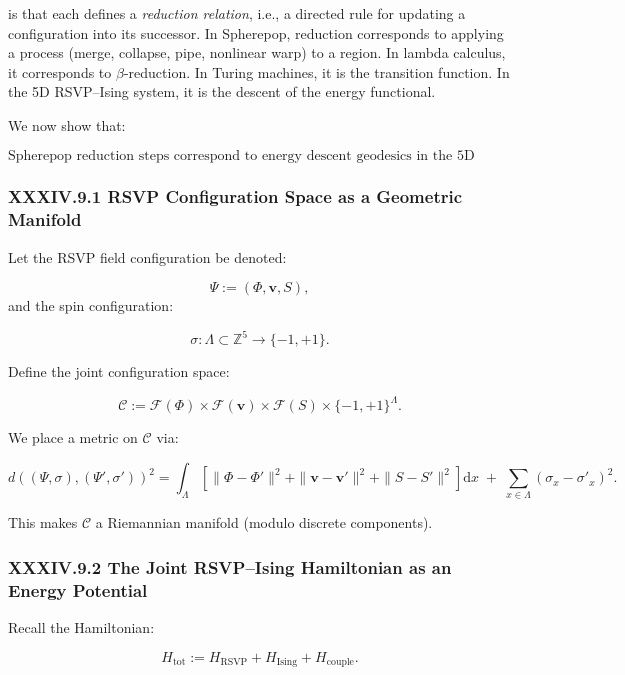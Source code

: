 \documentclass[11pt,letterpaper]{article}
\begin{document}
is that each defines a \emph{reduction relation}, i.e., a directed rule for updating a configuration into its successor. In Spherepop, reduction corresponds to applying a process (merge, collapse, pipe, nonlinear warp) to a region. In lambda calculus, it corresponds to $\beta$-reduction. In Turing machines, it is the transition function. In the 5D RSVP–Ising system, it is the descent of the energy functional.

We now show that:

\[
\boxed{
\text{Spherepop reduction steps correspond to energy descent geodesics
in the 5D RSVP--Ising manifold.}
}
\]

\subsubsection{XXXIV.9.1 RSVP Configuration Space as a Geometric Manifold}

Let the RSVP field configuration be denoted:

\[
\Psi := (\Phi, \mathbf{v}, S),
\]
and the spin configuration:

\[
\sigma : \Lambda \subset \mathbb{Z}^5 \to \{-1, +1\}.
\]

Define the joint configuration space:

\[
\mathcal{C} := \mathcal{F}(\Phi) \times \mathcal{F}(\mathbf{v}) \times \mathcal{F}(S) \times \{-1,+1\}^{\Lambda}.
\]

We place a metric on $\mathcal{C}$ via:

\[
d((\Psi,\sigma), (\Psi',\sigma'))^2
=
\int_{\Lambda}
\left[
\|\Phi-\Phi'\|^2 + \|\mathbf{v}-\mathbf{v}'\|^2 + \|S-S'\|^2
\right] \mathrm{d}x
\;+\;
\sum_{x \in \Lambda} (\sigma_x - \sigma'_x)^2.
\]

This makes $\mathcal{C}$ a Riemannian manifold (modulo discrete components).

\subsubsection{XXXIV.9.2 The Joint RSVP–Ising Hamiltonian as an Energy Potential}

Recall the Hamiltonian:

\[
H_{\text{tot}} := H_{\text{RSVP}} + H_{\text{Ising}} + H_{\text{couple}}.
\]
\end{document}
